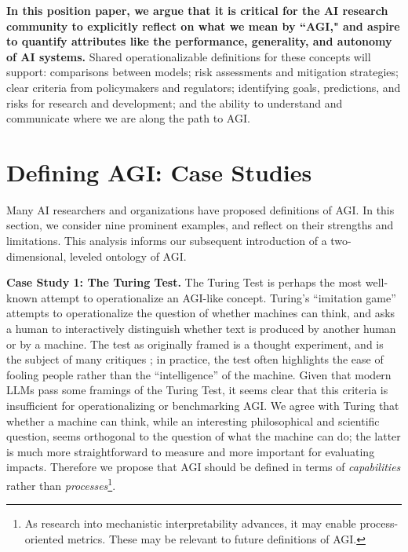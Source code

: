\documentclass{article}
\theoremstyle{plain}
\theoremstyle{definition}
\theoremstyle{remark}
\begin{document}
\textbf{In this position paper, we argue that it is critical for the AI research community to explicitly reflect on what we mean by  ``AGI," and aspire to quantify attributes like the performance, generality, and autonomy of AI systems.} 
Shared operationalizable definitions for these concepts will support:
comparisons between models; risk assessments and mitigation strategies; clear criteria from policymakers and regulators; identifying goals, predictions, and risks for research and development; and the ability to understand and communicate where we are along the path to AGI.



\section{Defining AGI: Case Studies}
\label{cases}

Many AI researchers and organizations have proposed definitions of AGI. In this section, we consider nine prominent examples, and reflect on their strengths and limitations. This analysis informs our subsequent introduction of a two-dimensional, leveled ontology of AGI. 

\textbf{Case Study 1: The Turing Test.} The Turing Test \citep{turingTest} is perhaps the most well-known attempt to operationalize an AGI-like concept. Turing’s “imitation game” 
attempts 
to operationalize the question of whether machines can think, and asks a human to interactively distinguish whether text is produced by another human or by a machine. The test as originally framed is a thought experiment, and is the subject of many critiques \citep{turingWeaknesses}; in practice, the test often highlights the ease of fooling people \citep{eliza, goostman} rather than the “intelligence” of the machine. Given that modern LLMs pass some framings of the Turing Test, it seems clear that this criteria is insufficient for operationalizing or benchmarking AGI. We agree with Turing that whether a machine can think, while an interesting philosophical and scientific question, seems orthogonal to the question of what the machine can do; the latter is much more straightforward to measure and more important for evaluating impacts. Therefore we propose that AGI should be defined in terms of \textit{capabilities} rather than \textit{processes}\footnote{As research into mechanistic interpretability \citep{transparent} advances, it may enable process-oriented metrics. These may be relevant to future definitions of AGI.}.
\end{document}
